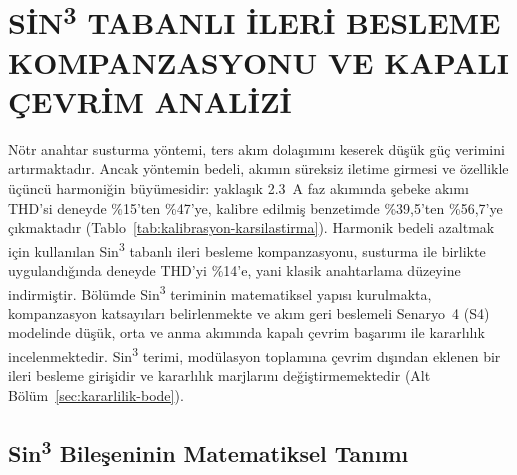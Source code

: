 \chapter{SİN\texorpdfstring{\textsuperscript{3}}{3} TABANLI İLERİ BESLEME KOMPANZASYONU VE KAPALI ÇEVRİM ANALİZİ}
\label{chap:sin3}

Nötr anahtar susturma yöntemi, ters akım dolaşımını keserek düşük güç verimini artırmaktadır. Ancak yöntemin bedeli, akımın süreksiz iletime girmesi ve özellikle üçüncü harmoniğin büyümesidir: yaklaşık \SI{2.3}{\ampere} faz akımında şebeke akımı THD'si deneyde \%15'ten \%47'ye, kalibre edilmiş benzetimde \%39,5'ten \%56,7'ye çıkmaktadır (Tablo~\ref{tab:kalibrasyon-karsilastirma}). Harmonik bedeli azaltmak için kullanılan Sin\textsuperscript{3} tabanlı ileri besleme kompanzasyonu, susturma ile birlikte uygulandığında deneyde THD'yi \%14'e, yani klasik anahtarlama düzeyine indirmiştir. Bölümde Sin\textsuperscript{3} teriminin matematiksel yapısı kurulmakta, kompanzasyon katsayıları belirlenmekte ve akım geri beslemeli Senaryo~4 (S4) modelinde düşük, orta ve anma akımında kapalı çevrim başarımı ile kararlılık incelenmektedir. Sin\textsuperscript{3} terimi, modülasyon toplamına çevrim dışından eklenen bir ileri besleme girişidir ve kararlılık marjlarını değiştirmemektedir (Alt Bölüm~\ref{sec:kararlilik-bode}).

\section{Sin\texorpdfstring{\textsuperscript{3}}{3} Bileşeninin Matematiksel Tanımı}


